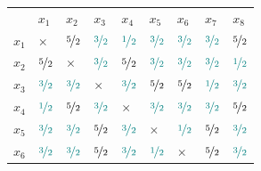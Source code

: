 \documentclass[12pt]{article}
\begin{document}
\begin{enumerate}[leftmargin=\labelsep]
  \begin{table}[h]
    \setlength{\tabcolsep}{5pt} %
    \renewcommand{\arraystretch}{1.35} %
    \centering
    \label{tab:my-table}
    \begin{tabular}{lllllllll}
          & $x_1$                           & $x_2$                           & $x_3$                           & $x_4$                           & $x_5$                           & $x_6$                           & $x_7$                           & $x_8$                           \\
    $x_1$ & $\times$                        & $\nicefrac{5}{2}$                   & $\textcolor{teal}{\nicefrac{3}{2}}$ & $\textcolor{teal}{\nicefrac{1}{2}}$ & $\textcolor{teal}{\nicefrac{3}{2}}$ & $\textcolor{teal}{\nicefrac{3}{2}}$ & $\textcolor{teal}{\nicefrac{3}{2}}$ & $\nicefrac{5}{2}$                   \\
    $x_2$ & $\nicefrac{5}{2}$                   & $\times$                        & $\textcolor{teal}{\nicefrac{3}{2}}$ & $\nicefrac{5}{2}$                   & $\textcolor{teal}{\nicefrac{3}{2}}$ & $\textcolor{teal}{\nicefrac{3}{2}}$ & $\textcolor{teal}{\nicefrac{3}{2}}$ & $\textcolor{teal}{\nicefrac{1}{2}}$ \\
    $x_3$ & $\textcolor{teal}{\nicefrac{3}{2}}$ & $\textcolor{teal}{\nicefrac{3}{2}}$ & $\times$                        & $\textcolor{teal}{\nicefrac{3}{2}}$ & $\nicefrac{5}{2}$                   & $\nicefrac{5}{2}$                   & $\textcolor{teal}{\nicefrac{1}{2}}$ & $\textcolor{teal}{\nicefrac{3}{2}}$ \\
    $x_4$ & $\textcolor{teal}{\nicefrac{1}{2}}$ & $\nicefrac{5}{2}$                   & $\textcolor{teal}{\nicefrac{3}{2}}$ & $\times$                        & $\textcolor{teal}{\nicefrac{3}{2}}$ & $\textcolor{teal}{\nicefrac{3}{2}}$ & $\textcolor{teal}{\nicefrac{3}{2}}$ & $\nicefrac{5}{2}$                   \\
    $x_5$ & $\textcolor{teal}{\nicefrac{3}{2}}$ & $\textcolor{teal}{\nicefrac{3}{2}}$ & $\nicefrac{5}{2}$                   & $\textcolor{teal}{\nicefrac{3}{2}}$ & $\times$                        & $\textcolor{teal}{\nicefrac{1}{2}}$ & $\nicefrac{5}{2}$                   & $\textcolor{teal}{\nicefrac{3}{2}}$ \\
    $x_6$ & $\textcolor{teal}{\nicefrac{3}{2}}$ & $\textcolor{teal}{\nicefrac{3}{2}}$ & $\nicefrac{5}{2}$                   & $\textcolor{teal}{\nicefrac{3}{2}}$ & $\textcolor{teal}{\nicefrac{1}{2}}$ & $\times$                        & $\nicefrac{5}{2}$                   & $\textcolor{teal}{\nicefrac{3}{2}}$ \\

\end{tabular}
\end{table}
\end{enumerate}
\end{document}
